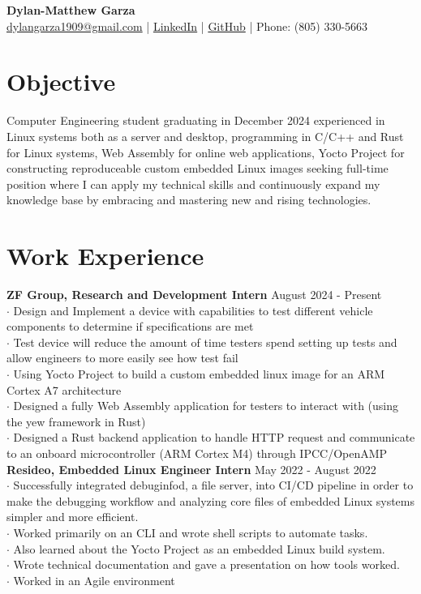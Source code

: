 \documentclass[a4paper,10pt]{article}
\begin{document}
\begin{center}
\textbf{\LARGE Dylan-Matthew Garza} \\[0.1cm]
\href{mailto:dylangarza1909@gmail.com}{dylangarza1909@gmail.com} |
\href{https://www.linkedin.com/in/dylan-matthew-garza-094b021ba/}{LinkedIn} |
\href{https://github.com/DMGDy}{GitHub} |
Phone: (805) 330-5663
\end{center}

\section*{Objective}
Computer Engineering student graduating in December 2024 experienced in Linux systems both as a server and desktop, programming in C/C++ and Rust for 
Linux systems, Web Assembly for online web applications, Yocto Project for constructing reproduceable custom embedded
Linux images seeking full-time position where I can apply my
technical skills and continuously expand my knowledge base by embracing and mastering new and rising technologies.

\vspace{-.5cm} \section*{Work Experience} \textbf{ZF Group, Research and Development Intern} \hfill August 2024 - Present\\ 
$\cdot$ Design and Implement a device with capabilities to test different vehicle components to determine if specifications are met\\
$\cdot$ Test device will reduce the amount of time testers spend setting up tests and allow engineers to more easily
  see how test fail\\
$\cdot$ Using Yocto Project to build a custom embedded linux image for an ARM Cortex A7 architecture \\
$\cdot$ Designed a fully Web Assembly application for testers to interact with (using the yew framework in Rust) \\
$\cdot$ Designed a Rust backend application to handle HTTP request and communicate to an onboard microcontroller (ARM Cortex M4)
through IPCC/OpenAMP\\


\vspace{-.25cm}\noindent\textbf{Resideo, Embedded Linux
Engineer Intern} \hfill May 2022 - August 2022\\ 
$\cdot$ Successfully integrated
debuginfod, a file server, into CI/CD pipeline in order to make the debugging
workflow and analyzing core files of embedded Linux systems simpler and more
efficient.\\
$\cdot$ Worked primarily on an CLI and wrote shell scripts to automate
tasks.\\
$\cdot$ Also learned about the Yocto Project as an embedded Linux build
system.\\
$\cdot$ Wrote technical documentation and gave a presentation on 
how tools worked.\\
$\cdot$ Worked in an Agile environment \\
\end{document}
